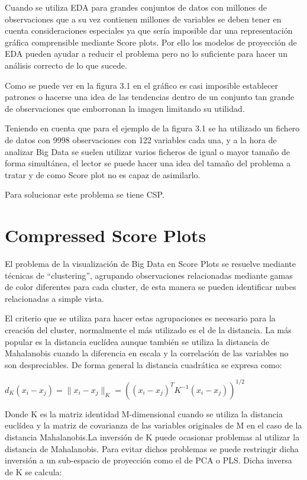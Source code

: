 Cuando se utiliza EDA para grandes conjuntos de datos con millones de observaciones que a su vez contienen millones de variables se deben tener en cuenta consideraciones especiales ya que sería imposible dar una representación gráfica comprensible mediante Score plots. Por ello los modelos de proyección de EDA pueden ayudar a reducir el problema pero no lo suficiente para hacer un análisis correcto de lo que sucede.
\bigskip

Como se puede ver en la figura 3.1 en el gráfico es casi imposible establecer patrones o hacerse una idea de las tendencias dentro de un conjunto tan grande de observaciones que emborronan la imagen limitando su utilidad.
\bigskip

Teniendo en cuenta que para el ejemplo de la figura 3.1 se ha utilizado un fichero de datos con 9998 observaciones con 122 variables cada una, y a la hora de analizar Big Data se suelen utilizar varios ficheros de igual o mayor tamaño de forma simultánea, el lector se puede hacer una idea del tamaño del problema a tratar y de como Score plot no es capaz de asimilarlo.

\bigskip
Para solucionar este problema se tiene CSP.

\bigskip

\section{Compressed Score Plots} \cite{CAILS}

El problema de la visualización de Big Data en Score Plots se resuelve mediante técnicas de “clustering”, agrupando observaciones relacionadas mediante gamas de color diferentes para cada cluster, de esta manera se pueden identificar nubes relacionadas a simple vista. 
\bigskip

El criterio que se utiliza para hacer estas agrupaciones es necesario para la creación del cluster, normalmente el más utilizado es el de la distancia. La más popular es la distancia euclídea aunque también se utiliza la distancia de Mahalanobis cuando la diferencia en escala y la correlación de las variables no son despreciables. De forma general la distancia cuadrática se expresa como:
\bigskip

$d_K(x_i-x_j)=\parallel x_i-x_j\parallel_K=((x_i-x_j)^T K^{-1} (x_i-x_j ))^{1/2}$

\bigskip

Donde K es la matriz identidad M-dimensional cuando se utiliza la distancia euclídea y la matriz de covarianza de las variables originales de M en el caso de la distancia Mahalanobis.La inversión de K puede ocasionar problemas al utilizar la distancia de  Mahalanobis. Para evitar dichos problemas se puede restringir dicha inversión a un sub-espacio de proyección como el de PCA o PLS. Dicha inversa de K se calcula:
\bigskip

